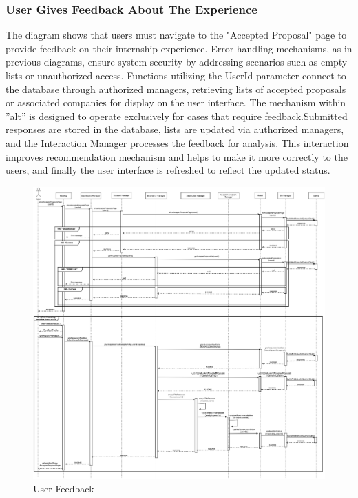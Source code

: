 \documentclass[a4paper,12pt]{article}
\begin{document}
\newpage

\subsubsection*{ User Gives Feedback About The Experience}
The diagram shows that users must navigate to the "Accepted Proposal" page to provide feedback on their internship experience. Error-handling mechanisms, as in previous diagrams, ensure system security by addressing scenarios such as empty lists or unauthorized access. Functions utilizing the UserId parameter connect to the database through authorized managers, retrieving lists of accepted proposals or associated companies for display on the user interface. The mechanism within ''alt'' is designed to operate exclusively for cases that require feedback.Submitted responses are stored in the database, lists are updated via authorized managers, and the Interaction Manager processes the feedback for analysis. This interaction improves recommendation mechanism and helps to make it more correctly to the users, and finally the user interface is refreshed to reflect the updated status.
    \begin{figure}[H]
    \centering
    \includegraphics[scale = 0.22]{DD_figures/RuntimeView/userGivesFeedback.drawio.png}
    \caption{User Feedback}
\end{figure}
\end{document}
